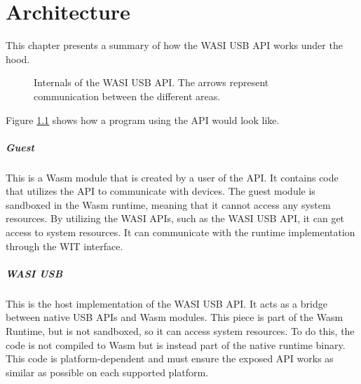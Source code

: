 \chapter{Architecture}

This chapter presents a summary of how the \acrshort{WASI} \acrshort{USB} \acrshort{API} works under the hood.

\begin{figure}[!h]
\centering
{}
\caption{Internals of the WASI USB API. The arrows represent communication between the different areas.}
\label{image:api_areas}
\end{figure}

Figure \ref{image:api_areas} shows how a program using the API would look like.

\paragraph{Guest} This is a Wasm module that is created by a user of the API. It contains code that utilizes the API to communicate with devices. The guest module is sandboxed in the Wasm runtime, meaning that it cannot access any system resources. By utilizing the WASI APIs, such as the WASI USB API, it can get access to system resources. It can communicate with the runtime implementation through the \acrshort{WIT} interface.

\paragraph{WASI USB} This is the host implementation of the WASI USB API. It acts as a bridge between native USB APIs and Wasm modules. This piece is part of the Wasm Runtime, but is not sandboxed, so it can access system resources. To do this, the code is not compiled to Wasm but is instead part of the native runtime binary. This code is platform-dependent and must ensure the exposed API works as similar as possible on each supported platform.

